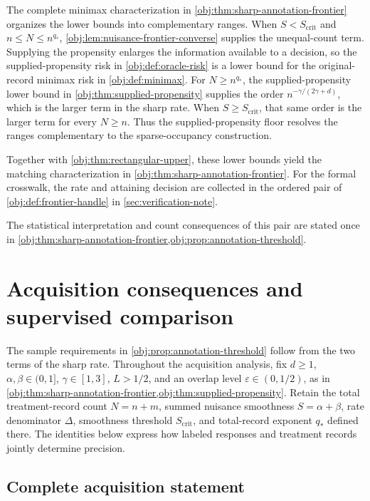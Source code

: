 \documentclass[11pt]{article}
\begin{document}
The complete minimax characterization in \cref{obj:thm:sharp-annotation-frontier} organizes the lower bounds into complementary ranges. When \(S<S_{\mathrm{crit}}\) and \(n\le N\le n^{q_*}\), \cref{obj:lem:nuisance-frontier-converse} supplies the unequal-count term. Supplying the propensity enlarges the information available to a decision, so the supplied-propensity risk in \cref{obj:def:oracle-risk} is a lower bound for the original-record minimax risk in \cref{obj:def:minimax}. For \(N\ge n^{q_*}\), the supplied-propensity lower bound in \cref{obj:thm:supplied-propensity} supplies the order \(n^{-\gamma/(2\gamma+d)}\), which is the larger term in the sharp rate. When \(S\ge S_{\mathrm{crit}}\), that same order is the larger term for every \(N\ge n\). Thus the supplied-propensity floor resolves the ranges complementary to the sparse-occupancy construction.

Together with \cref{obj:thm:rectangular-upper}, these lower bounds yield the matching characterization in \cref{obj:thm:sharp-annotation-frontier}. For the formal crosswalk, the rate and attaining decision are collected in the ordered pair of \cref{obj:def:frontier-handle} in \cref{sec:verification-note}.



The statistical interpretation and count consequences of this pair are stated once in \cref{obj:thm:sharp-annotation-frontier,obj:prop:annotation-threshold}.


\section{Acquisition consequences and supervised comparison}\label{sec:acquisition-consequences}

The sample requirements in \cref{obj:prop:annotation-threshold} follow from the two terms of the sharp rate. Throughout the acquisition analysis, fix \(d\ge1\), \(\alpha,\beta\in(0,1]\), \(\gamma\in[1,3]\), \(L>1/2\), and an overlap level \(\varepsilon\in(0,1/2)\), as in \cref{obj:thm:sharp-annotation-frontier,obj:thm:supplied-propensity}. Retain the total treatment-record count \(N=n+m\), summed nuisance smoothness \(S=\alpha+\beta\), rate denominator \(\Delta\), smoothness threshold \(S_{\mathrm{crit}}\), and total-record exponent \(q_*\) defined there. The identities below express how labeled responses and treatment records jointly determine precision.

\subsection{Complete acquisition statement}
\end{document}
